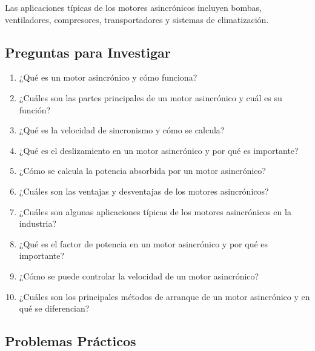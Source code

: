 \documentclass[../main]{subfiles}
\begin{document}
Las aplicaciones típicas de los motores asincrónicos incluyen bombas, ventiladores, compresores, transportadores y sistemas de climatización.

\subsection*{Preguntas para Investigar}

\begin{enumerate}
    \item ¿Qué es un motor asincrónico y cómo funciona?
    \item ¿Cuáles son las partes principales de un motor asincrónico y cuál es su función?
    \item ¿Qué es la velocidad de sincronismo y cómo se calcula?
    \item ¿Qué es el deslizamiento en un motor asincrónico y por qué es importante?
    \item ¿Cómo se calcula la potencia absorbida por un motor asincrónico?
    \item ¿Cuáles son las ventajas y desventajas de los motores asincrónicos?
    \item ¿Cuáles son algunas aplicaciones típicas de los motores asincrónicos en la industria?
    \item ¿Qué es el factor de potencia en un motor asincrónico y por qué es importante?
    \item ¿Cómo se puede controlar la velocidad de un motor asincrónico?
    \item ¿Cuáles son los principales métodos de arranque de un motor asincrónico y en qué se diferencian?
\end{enumerate}

\subsection*{Problemas Prácticos}
\end{document}
